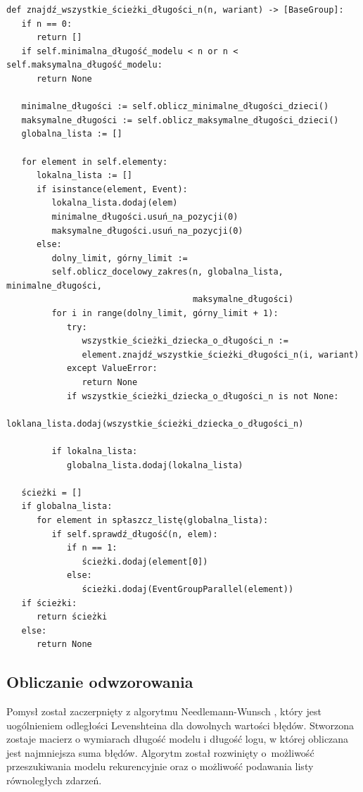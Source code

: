 \lstset{caption=Pseudokod wyszukiwania procesów o długości n, captionpos=b}
\lstset{label=src:get_n_length, frame=single}
\begin{lstlisting}[escapeinside=``]
def znajdź_wszystkie_ścieżki_długości_n(n, wariant) -> [BaseGroup]:
   if n == 0:
      return []
   if self.minimalna_długość_modelu < n or n < self.maksymalna_długość_modelu:
      return None

   minimalne_długości := self.oblicz_minimalne_długości_dzieci()
   maksymalne_długości := self.oblicz_maksymalne_długości_dzieci()
   globalna_lista := []

   for element in self.elementy:
      lokalna_lista := []
      if isinstance(element, Event):
         lokalna_lista.dodaj(elem)
         minimalne_długości.usuń_na_pozycji(0)
         maksymalne_długości.usuń_na_pozycji(0)
      else:
         dolny_limit, górny_limit := 
         self.oblicz_docelowy_zakres(n, globalna_lista, minimalne_długości, 
                                     maksymalne_długości)
         for i in range(dolny_limit, górny_limit + 1):
            try:
               wszystkie_ścieżki_dziecka_o_długości_n := 
               element.znajdź_wszystkie_ścieżki_długości_n(i, wariant)
            except ValueError:
               return None
            if wszystkie_ścieżki_dziecka_o_długości_n is not None:
               loklana_lista.dodaj(wszystkie_ścieżki_dziecka_o_długości_n)

         if lokalna_lista:
            globalna_lista.dodaj(lokalna_lista)

   ścieżki = []
   if globalna_lista:
      for element in spłaszcz_listę(globalna_lista):
         if self.sprawdź_długość(n, elem):
            if n == 1:
               ścieżki.dodaj(element[0])
            else:
               ścieżki.dodaj(EventGroupParallel(element))
   if ścieżki:
      return ścieżki
   else:
      return None
\end{lstlisting}

\subsection{Obliczanie odwzorowania}
Pomysł został zaczerpnięty z algorytmu Needlemann-Wunsch \cite{ea252fd3937a4a309a5e07e61e5531a7}, który jest uogólnieniem odległości Levenshteina dla dowolnych wartości błędów. Stworzona zostaje macierz o wymiarach długość modelu i długość logu, w której obliczana jest najmniejsza suma błędów. Algorytm został rozwinięty o~możliwość przeszukiwania modelu rekurencyjnie oraz o możliwość podawania listy równoległych zdarzeń.

